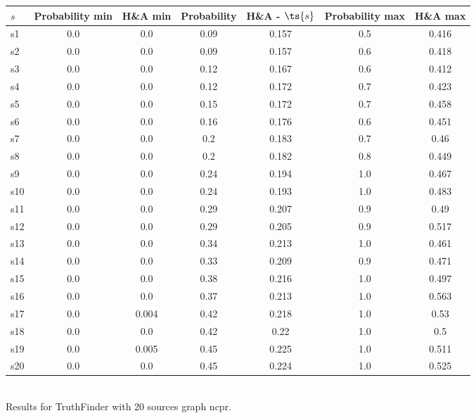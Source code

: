 \documentclass{article}
\begin{document}
\noindent\begin{tabular}{|l|c|c|c|c|c|c|}
\hline
$s$& Probability min & H\&A min & Probability & H\&A - $\ts{s}$ & Probability max & H\&A max\\
\hline
s1 &0.0 & 0.0 & 0.09 & 0.157 & 0.5 & 0.416\\
\hline
s2 &0.0 & 0.0 & 0.09 & 0.157 & 0.6 & 0.418\\
\hline
s3 &0.0 & 0.0 & 0.12 & 0.167 & 0.6 & 0.412\\
\hline
s4 &0.0 & 0.0 & 0.12 & 0.172 & 0.7 & 0.423\\
\hline
s5 &0.0 & 0.0 & 0.15 & 0.172 & 0.7 & 0.458\\
\hline
s6 &0.0 & 0.0 & 0.16 & 0.176 & 0.6 & 0.451\\
\hline
s7 &0.0 & 0.0 & 0.2 & 0.183 & 0.7 & 0.46\\
\hline
s8 &0.0 & 0.0 & 0.2 & 0.182 & 0.8 & 0.449\\
\hline
s9 &0.0 & 0.0 & 0.24 & 0.194 & 1.0 & 0.467\\
\hline
s10 &0.0 & 0.0 & 0.24 & 0.193 & 1.0 & 0.483\\
\hline
s11 &0.0 & 0.0 & 0.29 & 0.207 & 0.9 & 0.49\\
\hline
s12 &0.0 & 0.0 & 0.29 & 0.205 & 0.9 & 0.517\\
\hline
s13 &0.0 & 0.0 & 0.34 & 0.213 & 1.0 & 0.461\\
\hline
s14 &0.0 & 0.0 & 0.33 & 0.209 & 0.9 & 0.471\\
\hline
s15 &0.0 & 0.0 & 0.38 & 0.216 & 1.0 & 0.497\\
\hline
s16 &0.0 & 0.0 & 0.37 & 0.213 & 1.0 & 0.563\\
\hline
s17 &0.0 & 0.004 & 0.42 & 0.218 & 1.0 & 0.53\\
\hline
s18 &0.0 & 0.0 & 0.42 & 0.22 & 1.0 & 0.5\\
\hline
s19 &0.0 & 0.005 & 0.45 & 0.225 & 1.0 & 0.511\\
\hline
s20 &0.0 & 0.0 & 0.45 & 0.224 & 1.0 & 0.525\\
\hline
\end{tabular}\\

\noindent Results for TruthFinder with 20 sources graph ncpr.
\end{document}
